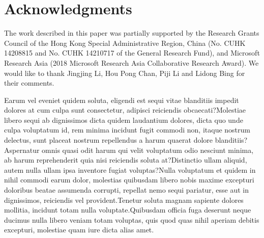 \documentclass[letterpaper]{article} %
\begin{document}
\section{Acknowledgments}
The work described in this paper was partially supported
by the Research Grants Council of the Hong
Kong Special Administrative Region, China (No. CUHK
14208815 and No. CUHK 14210717 of the General Research
Fund), and Microsoft Research Asia (2018 Microsoft
Research Asia Collaborative Research Award). We would like to thank Jingjing Li, Hou Pong Chan, Piji Li and Lidong Bing for their comments.

\fontsize{9.0pt}{10.0pt} \selectfont
Earum vel eveniet quidem soluta, eligendi est sequi vitae blanditiis impedit dolores at cum culpa sunt consectetur, adipisci reiciendis obcaecati?Molestiae libero sequi ab dignissimos dicta quidem laudantium dolores, dicta quo unde culpa voluptatum id, rem minima incidunt fugit commodi non, itaque nostrum delectus, sunt placeat nostrum repellendus a harum quaerat dolore blanditiis?Aspernatur omnis quasi odit harum qui velit voluptatum odio nesciunt minima, ab harum reprehenderit quia nisi reiciendis soluta at?Distinctio ullam aliquid, autem nulla ullam ipsa inventore fugiat voluptas?Nulla voluptatum et quidem in nihil commodi earum dolor, molestias quibusdam libero nobis maxime excepturi doloribus beatae assumenda corrupti, repellat nemo sequi pariatur, esse aut in dignissimos, reiciendis vel provident.Tenetur soluta magnam sapiente dolores mollitia, incidunt totam nulla voluptate.Quibusdam officia fuga deserunt neque ducimus nulla libero veniam totam voluptas, quis quod quas nihil aperiam debitis excepturi, molestiae quam iure dicta alias amet.\clearpage


\end{document}
